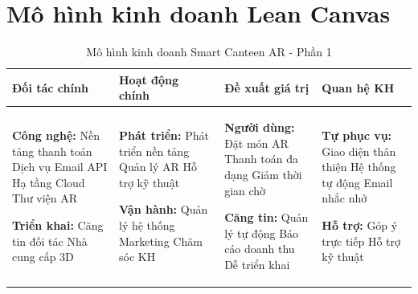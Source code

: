 \documentclass[12pt,a4paper]{article}
\begin{document}
\section{Mô hình kinh doanh Lean Canvas}

\begin{table}[H]
\centering
\caption{Mô hình kinh doanh Smart Canteen AR - Phần 1}
\label{tab:lean-canvas-1}
\begin{tabular}{|>{\raggedright\arraybackslash}p{3cm}|>{\raggedright\arraybackslash}p{3cm}|>{\raggedright\arraybackslash}p{3cm}|>{\raggedright\arraybackslash}p{3cm}|}
\hline
\textbf{Đối tác chính} & \textbf{Hoạt động chính} & \textbf{Đề xuất giá trị} & \textbf{Quan hệ KH} \\
\hline
\textbf{Công nghệ:}
\newline \textbullet{} Nền tảng thanh toán
\newline \textbullet{} Dịch vụ Email API
\newline \textbullet{} Hạ tầng Cloud
\newline \textbullet{} Thư viện AR

\textbf{Triển khai:}
\newline \textbullet{} Căng tin đối tác
\newline \textbullet{} Nhà cung cấp 3D &

\textbf{Phát triển:}
\newline \textbullet{} Phát triển nền tảng
\newline \textbullet{} Quản lý AR
\newline \textbullet{} Hỗ trợ kỹ thuật

\textbf{Vận hành:}
\newline \textbullet{} Quản lý hệ thống
\newline \textbullet{} Marketing
\newline \textbullet{} Chăm sóc KH &

\textbf{Người dùng:}
\newline \textbullet{} Đặt món AR
\newline \textbullet{} Thanh toán đa dạng
\newline \textbullet{} Giảm thời gian chờ

\textbf{Căng tin:}
\newline \textbullet{} Quản lý tự động
\newline \textbullet{} Báo cáo doanh thu
\newline \textbullet{} Dễ triển khai &

\textbf{Tự phục vụ:}
\newline \textbullet{} Giao diện thân thiện
\newline \textbullet{} Hệ thống tự động
\newline \textbullet{} Email nhắc nhở

\textbf{Hỗ trợ:}
\newline \textbullet{} Góp ý trực tiếp
\newline \textbullet{} Hỗ trợ kỹ thuật \\
\hline
\end{tabular}
\end{table}
\end{document}
